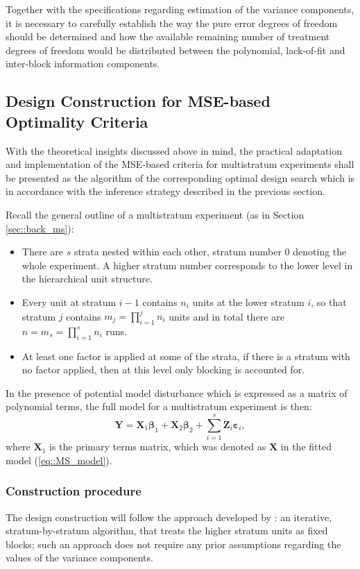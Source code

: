 Together with the specifications regarding estimation of the variance components, it is necessary to carefully establish the way the pure error degrees of freedom should be determined and how the available remaining number of treatment degrees of freedom would be distributed between the polynomial, lack-of-fit and inter-block information components. 

\subsection{Design Construction for MSE-based Optimality Criteria}
\label{sec::ch7_search}
With the theoretical insights discussed above in mind, the practical adaptation and implementation of the MSE-based criteria for multistratum experiments shall be presented as the algorithm of the corresponding optimal design search which is in accordance with the inference strategy described in the previous section.

Recall the general outline of a multistratum experiment (as in Section \ref{sec::back_ms}): 
\begin{itemize}
\item There are $s$ strata nested within each other, stratum number $0$ denoting the whole experiment. A higher stratum number corresponds to the lower level in the hierarchical unit structure.
\item Every unit at stratum $i-1$ contains $n_i$ units at the lower stratum $i$, so that stratum $j$ contains $m_j=\prod_{i=1}^{j}n_{i}$ units and in total there are $n=m_{s}=\prod_{i=1}^{s}n_{i}$ runs. 
\item At least one factor is applied at some of the strata, if there is a stratum with no factor applied, then at this level only blocking is accounted for.
\end{itemize}

In the presence of potential model disturbance which is expressed as a matrix of polynomial terms, the full model for a multistratum experiment is then:
\begin{equation}
\label{eq::MS_model_full}
\bm{Y}=\bm{X}_1\bm{\beta}_1+\bm{X}_2\bm{\beta}_2+\sum_{i=1}^{s}\bm{Z}_{i}\bm{\varepsilon}_{i},
\end{equation}
where $\bm{X}_1$ is the primary terms matrix, which was denoted as $\bm{X}$ in the fitted model (\ref{eq::MS_model}). 

\subsubsection{Construction procedure}
The design construction will follow the approach developed by \cite{Trinca2015improved}: an iterative, stratum-by-stratum algorithm, that treats the higher stratum units as fixed blocks; such an approach does not require any prior assumptions regarding the values of the variance components. 

